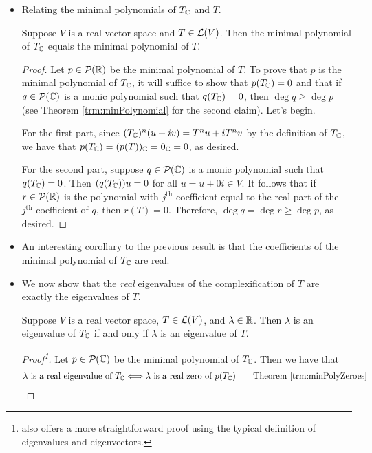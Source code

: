 \documentclass[../main.tex]{subfiles}
\begin{document}
\begin{itemize}
\begin{theorem}
    \end{theorem}
    \item Relating the minimal polynomials of $T_{\mathbb{C}}$ and $T$.
    \begin{theorem}\label{trm:minPolyTcT}
        Suppose $V$ is a real vector space and $T\in\mathcal{L}(V)$. Then the minimal polynomial of $T_{\mathbb{C}}$ equals the minimal polynomial of $T$.
        \begin{proof}
            Let $p\in\mathcal{P}_{}(\mathbb{R})$ be the minimal polynomial of $T$. To prove that $p$ is the minimal polynomial of $T_{\mathbb{C}}$, it will suffice to show that $p(T_{\mathbb{C}})=0$ and that if $q\in\mathcal{P}_{}(\mathbb{C})$ is a monic polynomial such that $q(T_{\mathbb{C}})=0$, then $\deg q\geq \deg p$ (see Theorem \ref{trm:minPolynomial} for the second claim). Let's begin.\par
            For the first part, since $(T_{\mathbb{C}})^n(u+iv)=T^nu+iT^nv$ by the definition of $T_{\mathbb{C}}$, we have that $p(T_{\mathbb{C}})=(p(T))_{\mathbb{C}}=0_{\mathbb{C}}=0$, as desired.\par
            For the second part, suppose $q\in\mathcal{P}_{}(\mathbb{C})$ is a monic polynomial such that $q(T_{\mathbb{C}})=0$. Then $(q(T_{\mathbb{C}}))u=0$ for all $u=u+0i\in V$. It follows that if $r\in\mathcal{P}_{}(\mathbb{R})$ is the polynomial with $j^\text{th}$ coefficient equal to the real part of the $j^\text{th}$ coefficient of $q$, then $r(T)=0$. Therefore, $\deg q=\deg r\geq\deg p$, as desired.
        \end{proof}
    \end{theorem}
    \item An interesting corollary to the previous result is that the coefficients of the minimal polynomial of $T_{\mathbb{C}}$ are real.
    \item We now show that the \emph{real} eigenvalues of the complexification of $T$ are exactly the eigenvalues of $T$.
    \begin{theorem}\label{trm:realEigenvalueComplexification}
        Suppose $V$ is a real vector space, $T\in\mathcal{L}(V)$, and $\lambda\in\mathbb{R}$. Then $\lambda$ is an eigenvalue of $T_{\mathbb{C}}$ if and only if $\lambda$ is an eigenvalue of $T$.
        \begin{proof}[Proof\footnote{\textcite{bib:Axler} also offers a more straightforward proof using the typical definition of eigenvalues and eigenvectors.}]
            Let $p\in\mathcal{P}_{}(\mathbb{C})$ be the minimal polynomial of $T_{\mathbb{C}}$.
            Then we have that
            \begin{align*}
                \lambda\text{ is a real eigenvalue of }T_\C &\Longleftrightarrow \lambda\text{ is a real zero of }p(T_\C)\tag*{Theorem \ref{trm:minPolyZeroes}}\\

\end{align*}
\end{proof}
\end{theorem}
\end{itemize}
\end{document}
